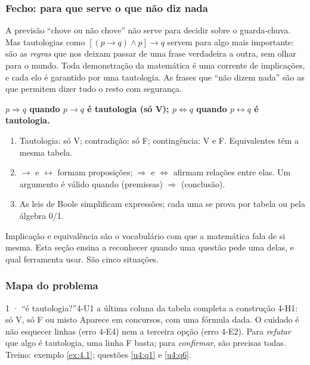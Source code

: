 \subsubsection{Fecho: para que serve o que não diz nada}
A previsão \enquote{chove ou não chove} não serve para decidir sobre o guarda-chuva. Mas tautologias como $[(p\rightarrow q)\wedge p]\rightarrow q$ servem para algo mais importante: são as \emph{regras} que nos deixam passar de uma frase verdadeira a outra, sem olhar para o mundo. Toda demonstração da matemática é uma corrente de implicações, e cada elo é garantido por uma tautologia. As frases que \enquote{não dizem nada} são as que permitem dizer tudo o resto com segurança.

\begin{paralembrar}\label{lembrar-u4}
\textbf{$p\Rightarrow q$ quando $p\rightarrow q$ é tautologia (só V); $p\Leftrightarrow q$ quando $p\leftrightarrow q$ é tautologia.}
\begin{enumerate}[label=\arabic*.,leftmargin=1.4em]
  \item Tautologia: só V; contradição: só F; contingência: V e F. Equivalentes têm a mesma tabela.
  \item $\rightarrow$ e $\leftrightarrow$ formam proposições; $\Rightarrow$ e $\Leftrightarrow$ afirmam relações entre elas. Um argumento é válido quando (premissas) $\Rightarrow$ (conclusão).
  \item As leis de Boole simplificam expressões; cada uma se prova por tabela ou pela álgebra 0/1.
\end{enumerate}
\end{paralembrar}

\OndeEUsado

Implicação e equivalência são o vocabulário com que a matemática fala de si mesma. Esta seção ensina a reconhecer quando uma questão pede uma delas, e qual ferramenta usar. São cinco situações.

\subsubsection{Mapa do problema}

\begin{caso}{1 · \enquote{é tautologia?}}{4-U1}
{a última coluna da tabela completa}
{a construção 4-H1: só V, só F ou misto}
\reconhecer Aparece em concursos, com uma fórmula dada. O cuidado é não esquecer linhas (erro 4-E4) nem a terceira opção (erro 4-E2). Para \emph{refutar} que algo é tautologia, uma linha F basta; para \emph{confirmar}, são precisas todas. Treino: exemplo \ref{ex:4.1}; questões \ref{u4:q1} e \ref{u4:q6}.
\end{caso}

